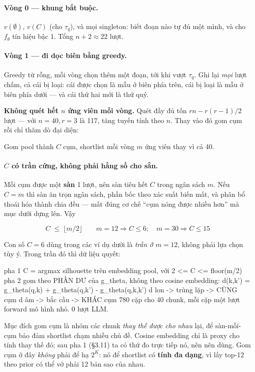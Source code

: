 \documentclass[11pt,a4paper]{article}
\begin{document}
\paragraph{Vòng 0 --- khung bắt buộc.} $v(\emptyset)$, $v(C)$ (cho $\tau_q$), và mọi
singleton: biết đoạn nào tự đủ một mình, và cho $f_\theta$ tín hiệu bậc 1. Tổng $n+2\approx
22$ lượt.

\paragraph{Vòng 1 --- đi dọc biên bằng greedy.} Greedy từ rỗng, mỗi vòng chọn thêm một
đoạn, tới khi vượt $\tau_q$. Ghi lại \emph{mọi} lượt chấm, cả cái bị loại: cái được chọn là
mẫu ở biên phía trên, cái bị loại là mẫu ở biên phía dưới --- và cái thứ hai mới là thứ quý.

\textbf{Không quét hết $n$ ứng viên mỗi vòng.} Quét đầy đủ tốn $rn-r(r-1)/2$ lượt --- với
$n=40,r=3$ là 117, tăng tuyến tính theo $n$. Thay vào đó gom cụm rồi chỉ thăm dò đại diện:

Gom pool thành $C$ cụm, shortlist mỗi vòng $m$ ứng viên thay vì cả 40.

\paragraph{$C$ có trần cứng, không phải hằng số cho sẵn.} Mỗi cụm được một \textbf{sàn} 1
lượt, nên sàn tiêu hết $C$ trong ngân sách $m$. Nếu $C=m$ thì sàn ăn trọn ngân sách, phần bốc
theo xác suất biến mất, và phân bổ thoái hóa thành chia đều --- mất đúng cơ chế ``cụm nóng
được nhiều hơn'' mà mục dưới dựng lên. Vậy

\[ C\;\le\;\lfloor m/2\rfloor \qquad m=12\Rightarrow C\le 6;\quad m=30\Rightarrow C\le 15 \]

Con số $C=6$ dùng trong các ví dụ dưới là \emph{trần ở $m=12$}, không phải lựa chọn tùy ý.
Trong trần đó thì dữ liệu quyết:

\begin{dia}
pha 1   C = argmax silhouette trên embedding pool,  với  2 <= C <= floor(m/2)
pha 2   gom theo PHẦN DƯ của g_theta, không theo cosine embedding:
            d(k,k')  =  g_theta(q,{k}) + g_theta(q,{k'}) - g_theta(q,{k,k'})
            d lon   -> trùng lặp -> CÙNG cụm
            d âm    -> bắc cầu   -> KHÁC cụm
        780 cặp cho 40 chunk, mỗi cặp một lượt forward mô hình nhỏ. 0 lượt LLM.
\end{dia}

Mục đích gom cụm là nhóm các chunk \emph{thay thế được cho nhau} lại, để sàn-mỗi-cụm bảo đảm
shortlist chạm nhiều chủ đề. Cosine embedding chỉ là proxy cho tính thay thế đó; sau pha 1
(\S3.11) ta có thứ đo trực tiếp nó, nên nên dùng. Gom cụm ở đây \emph{không} phải để hạ $2^K$: nó để shortlist có
\textbf{tính đa dạng}, vì lấy top-12 theo prior có thể vớ phải 12 bản sao của nhau.
\end{document}
